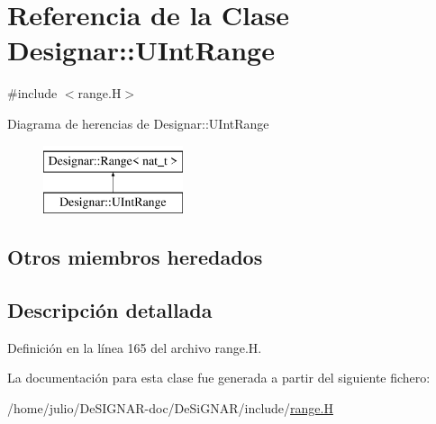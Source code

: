 \hypertarget{class_designar_1_1_u_int_range}{}\section{Referencia de la Clase Designar\+:\+:U\+Int\+Range}
\label{class_designar_1_1_u_int_range}


{\ttfamily \#include $<$range.\+H$>$}

Diagrama de herencias de Designar\+:\+:U\+Int\+Range\begin{figure}[H]
\begin{center}
\leavevmode
\includegraphics[height=2.000000cm]{class_designar_1_1_u_int_range}
\end{center}
\end{figure}
\subsection*{Otros miembros heredados}


\subsection{Descripción detallada}


Definición en la línea 165 del archivo range.\+H.



La documentación para esta clase fue generada a partir del siguiente fichero\+:\begin{DoxyCompactItemize}
\item 
/home/julio/\+De\+S\+I\+G\+N\+A\+R-\/doc/\+De\+Si\+G\+N\+A\+R/include/\hyperlink{range_8_h}{range.\+H}\end{DoxyCompactItemize}
